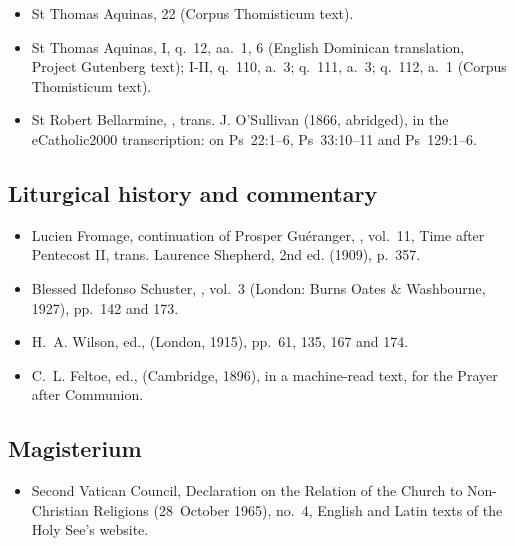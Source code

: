 {\begin{itemize}[itemsep=0pt,topsep=.25em]
\item St Thomas Aquinas,  22 (Corpus Thomisticum text).
\item St Thomas Aquinas,  I, q.~12, aa.~1, 6 (English Dominican translation, Project Gutenberg text); I-II, q.~110, a.~3; q.~111, a.~3; q.~112, a.~1 (Corpus Thomisticum text).
\item St Robert Bellarmine, , trans. J. O'Sullivan (1866, abridged), in the eCatholic2000 transcription: on Ps~22:1--6, Ps~33:10--11 and Ps~129:1--6.
\end{itemize}

\subsection*{Liturgical history and commentary}
\begin{itemize}[itemsep=0pt,topsep=.25em]
\item Lucien Fromage, continuation of Prosper Gu\'eranger, , vol.~11, Time after Pentecost II, trans. Laurence Shepherd, 2nd ed. (1909), p.~357.
\item Blessed Ildefonso Schuster, , vol.~3 (London: Burns Oates \& Washbourne, 1927), pp.~142 and 173.
\item H.~A. Wilson, ed.,  (London, 1915), pp.~61, 135, 167 and 174.
\item C.~L. Feltoe, ed.,  (Cambridge, 1896), in a machine-read text, for the Prayer after Communion.
\end{itemize}

\subsection*{Magisterium}
\begin{itemize}[itemsep=0pt,topsep=.25em]
\item Second Vatican Council, Declaration on the Relation of the Church to Non-Christian Religions  (28~October 1965), no.~4, English and Latin texts of the Holy See's website.
\end{itemize}

}
